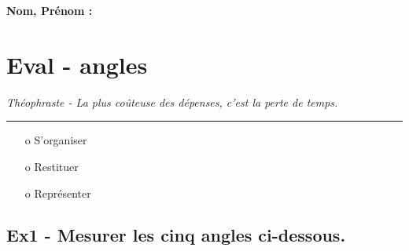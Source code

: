 \documentclass[11pt]{article}
\newcommand{\horrule}[1]{\rule{\linewidth}{#1}} %
\begin{document}

\newtheorem{Definition}{Définition}
\newtheorem{Theorem}{Théorème}
\newtheorem{Proposition}{Propriété}

\renewcommand{\labelitemi}{$\bullet$}
\renewcommand{\labelitemii}{$\circ$}

\setlength{\columnseprule}{1pt}

\textbf{Nom, Prénom : }

\section*{Eval - angles}
\begin{center}
  \textit{Théophraste - La plus coûteuse des dépenses, c’est la perte de temps.}
\end{center}
\horrule{2px}

\begin{multicols}{3}
\begin{itemize}
\item[o] S'organiser
\item[o] Restituer
\item[o] Représenter
\end{itemize}
\end{multicols}

\subsection*{Ex1 - Mesurer les cinq angles ci-dessous.}
\end{document}
